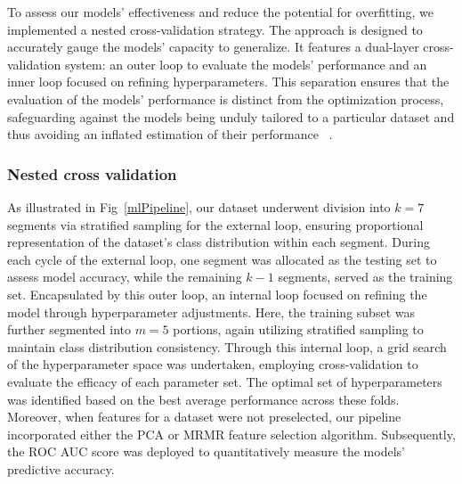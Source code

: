 To assess our models' effectiveness and reduce the potential for overfitting, we implemented a nested cross-validation strategy. The approach is 
designed to accurately gauge the models' capacity to generalize. It features a dual-layer cross-validation system: an outer loop to evaluate the 
models' performance and an inner loop focused on refining hyperparameters. This separation ensures that the evaluation of the models' performance is 
distinct from the optimization process, safeguarding against the models being unduly tailored to a particular dataset and thus avoiding an inflated 
estimation of their performance
~\cite{baumann_baumann_2014}.

\subsubsection*{Nested cross validation}

As illustrated in Fig~\ref{mlPipeline}, our dataset underwent division into $ k = 7 $ segments via stratified sampling for the external loop, ensuring proportional 
representation of the dataset's class distribution within each segment. During each cycle of the external loop, one segment was allocated as the 
testing set to assess model accuracy, while the remaining $ k - 1 $ segments, served as the training set. Encapsulated by this outer loop, an internal 
loop focused on refining the model through hyperparameter adjustments. Here, the training subset was further segmented into $ m = 5 $ portions, again utilizing 
stratified sampling to maintain class distribution consistency. Through this internal loop, a grid search of the hyperparameter space was undertaken, 
employing cross-validation to evaluate the efficacy of each parameter set. The optimal set of hyperparameters was identified based on the best average 
performance across these folds. Moreover, when features for a dataset were not preselected, our pipeline incorporated either the PCA or MRMR feature selection 
algorithm. Subsequently, the ROC AUC score was deployed to quantitatively measure the models' predictive accuracy.

